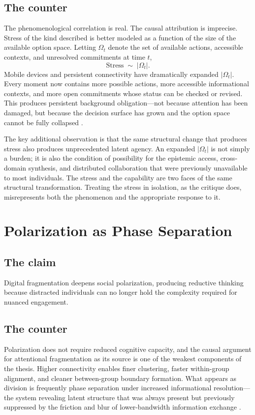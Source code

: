 \documentclass[12pt, a4paper]{article}
\begin{document}
\subsection{The counter}
The phenomenological correlation is real. The causal attribution is imprecise. Stress of the kind described is better modeled as a function of the size of the available option space. Letting $\Omega_t$ denote the set of available actions, accessible contexts, and unresolved commitments at time $t$,
\[
\text{Stress} \;\sim\; |\Omega_t|.
\]
Mobile devices and persistent connectivity have dramatically expanded $|\Omega_t|$. Every moment now contains more possible actions, more accessible informational contexts, and more open commitments whose status can be checked or revised. This produces persistent background obligation---not because attention has been damaged, but because the decision surface has grown and the option space cannot be fully collapsed \cite{Simon1969}.

The key additional observation is that the same structural change that produces stress also produces unprecedented latent agency. An expanded $|\Omega_t|$ is not simply a burden; it is also the condition of possibility for the epistemic access, cross-domain synthesis, and distributed collaboration that were previously unavailable to most individuals. The stress and the capability are two faces of the same structural transformation. Treating the stress in isolation, as the critique does, misrepresents both the phenomenon and the appropriate response to it.

\section{Polarization as Phase Separation}

\subsection{The claim}
Digital fragmentation deepens social polarization, producing reductive thinking because distracted individuals can no longer hold the complexity required for nuanced engagement.

\subsection{The counter}
Polarization does not require reduced cognitive capacity, and the causal argument for attentional fragmentation as its source is one of the weakest components of the thesis. Higher connectivity enables finer clustering, faster within-group alignment, and cleaner between-group boundary formation. What appears as division is frequently phase separation under increased informational resolution---the system revealing latent structure that was always present but previously suppressed by the friction and blur of lower-bandwidth information exchange \cite{Prigogine1984}.
\end{document}

